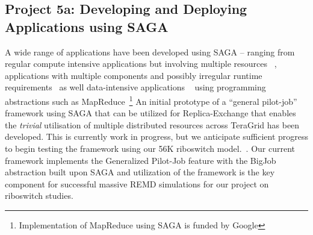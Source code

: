 \documentclass[a4paper,10pt]{article}
\newcommand{\up}{\vspace*{-1em}}
\begin{document}
\up
\subsection*{Project 5a: Developing and Deploying Applications using SAGA}
\up

A wide range of applications have been developed using SAGA -- ranging from regular compute 
intensive applications but involving multiple resources ~\cite{saga_escience07, gmac, REMD-
PhilTranA2009}, applications with multiple components and possibly irregular runtime 
requirements~\cite{saga_loosely_coupled, teragrid08} as well data-intensive applications 
~\cite{saga_data_intensive, saga_grid_cloud} using programming abstractions such as 
MapReduce~\footnote{Implementation of MapReduce using SAGA is funded by Google} An initial 
prototype of a ``general pilot-job'' framework using SAGA that can be utilized for Replica-Exchange 
that enables the {\it trivial} utilisation of multiple distributed resources across TeraGrid has 
been developed. This is currently work in progress, but we anticipate sufficient progress to begin 
testing the framework using our 56K riboswitch model.~\cite{REMD-PhilTranA2009}. %
Our current framework implements the Generalized Pilot-Job feature with the BigJob abstraction 
built upon SAGA and utilization of the framework is the key component for successful massive REMD 
simulations for our project on riboswitch studies.
\end{document}
